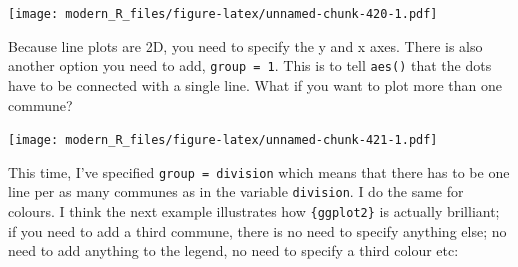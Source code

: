 \documentclass[]{gitbook}
\newenvironment{Shaded}{\begin{snugshade}}{\end{snugshade}}
\newcommand{\DataTypeTok}[1]{\textcolor[rgb]{0.13,0.29,0.53}{#1}}
\newcommand{\KeywordTok}[1]{\textcolor[rgb]{0.13,0.29,0.53}{\textbf{#1}}}
\newcommand{\NormalTok}[1]{#1}
\newcommand{\OperatorTok}[1]{\textcolor[rgb]{0.81,0.36,0.00}{\textbf{#1}}}
\newcommand{\StringTok}[1]{\textcolor[rgb]{0.31,0.60,0.02}{#1}}
\begin{document}
\texttt{[image: modern\_R\_files/figure-latex/unnamed-chunk-420-1.pdf]}

Because line plots are 2D, you need to specify the y and x axes. There is also another option you
need to add, \texttt{group\ =\ 1}. This is to tell \texttt{aes()} that the dots have to be connected with a single
line. What if you want to plot more than one commune?

\begin{Shaded}
\end{Shaded}

\texttt{[image: modern\_R\_files/figure-latex/unnamed-chunk-421-1.pdf]}

This time, I've specified \texttt{group\ =\ division} which means that there has to be one line per as many
communes as in the variable \texttt{division}. I do the same for colours. I think the next example
illustrates how \texttt{\{ggplot2\}} is actually brilliant; if you need to add a third commune, there is no
need to specify anything else; no need to add anything to the legend, no need to specify a third
colour etc:

\begin{Shaded}
\end{Shaded}
\end{document}
